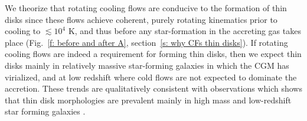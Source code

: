 \documentclass[fleqn,usenatbib]{mnras}
\begin{document}
\begin{enumerate}
We theorize that rotating cooling flows are conducive to the formation of thin disks since these flows achieve coherent, purely rotating kinematics prior to cooling to $\lesssim10^4$ K, and thus before any star-formation in the accreting gas takes place (Fig.~\ref{f: before and after A}, section~\ref{s: why CFs thin disks}).
If rotating cooling flows are indeed a requirement for forming thin disks, then we expect thin disks mainly in relatively massive star-forming galaxies in which the CGM has virialized, and at low redshift where cold flows are not expected to dominate the accretion.
These trends are qualitatively consistent with observations which shows that thin disk morphologies are prevalent mainly in high mass and low-redshift star forming galaxies \citep{Kassin2012, Simons2017}. 
    
\end{enumerate}


\end{document}
